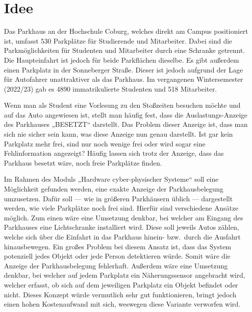 \section{Idee}\label{ch:Einleitung}
Das Parkhaus an der Hochschule Coburg, welches direkt am Campus positioniert ist, umfasst 530 Parkplätze für Studierende und Mitarbeiter.
Dabei sind die Parkmöglichkeiten für Studenten und Mitarbeiter durch eine Schranke getrennt.
Die Haupteinfahrt ist jedoch für beide Parkflächen dieselbe.
Es gibt außerdem einen Parkplatz in der Sonneberger Straße.
Dieser ist jedoch aufgrund der Lage für Autofahrer unattraktiver als das Parkhaus.
Im vergangenen Wintersemester (2022/23) gab es 4890 immatrikulierte Studenten und 518 Mitarbeiter.

Wenn man als Student eine Vorlesung zu den Stoßzeiten besuchen möchte und auf das Auto angewiesen ist, stellt man häufig fest, dass die Auslastungs-Anzeige des Parkhauses „BESETZT“ darstellt.
Das Problem dieser Anzeige ist, dass man sich nie sicher sein kann, was diese Anzeige nun genau darstellt.
Ist gar kein Parkplatz mehr frei, sind nur noch wenige frei oder wird sogar eine Fehlinformation angezeigt?
Häufig lassen sich trotz der Anzeige, dass das Parkhaus besetzt wäre, noch freie Parkplätze finden.

Im Rahmen des Moduls „Hardware cyber-physischer Systeme“ soll eine Möglichkeit gefunden werden, eine exakte Anzeige der Parkhausbelegung umzusetzen.
Dafür soll --- wie in größeren Parkhäusern üblich --- dargestellt werden, wie viele Parkplätze noch frei sind.
Hierfür sind verschiedene Ansätze möglich.
Zum einen wäre eine Umsetzung denkbar, bei welcher am Eingang des Parkhauses eine Lichtschranke installiert wird.
Diese soll jeweils Autos zählen, welche sich über die Einfahrt in das Parkhaus hinein- bzw.\ durch die Ausfahrt hinausbewegen.
Ein großes Problem bei diesem Ansatz ist, dass das System potenziell jedes Objekt oder jede Person detektieren würde.
Somit wäre die Anzeige der Parkhausbelegung fehlerhaft.
Außerdem wäre eine Umsetzung denkbar, bei welcher auf jedem Parkplatz ein Näherungssensor angebracht wird, welcher erfasst, ob sich auf dem jeweiligen Parkplatz ein Objekt befindet oder nicht.
Dieses Konzept würde vermutlich sehr gut funktionieren, bringt jedoch einen hohen Kostenaufwand mit sich, weswegen diese Variante verworfen wird.

